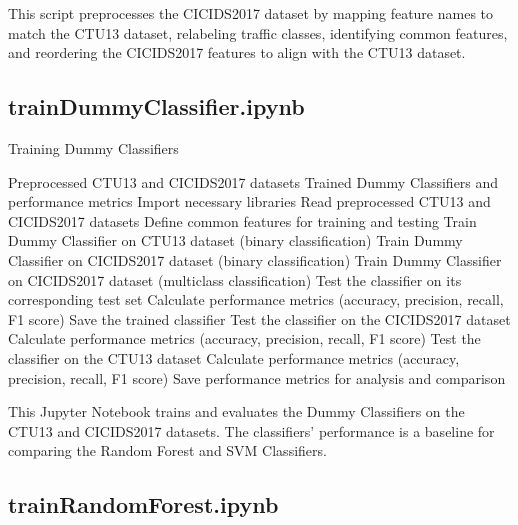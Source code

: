 This script preprocesses the CICIDS2017 dataset by mapping feature names to match the CTU13 dataset, relabeling traffic classes, identifying common features, and reordering the CICIDS2017 features to align with the CTU13 dataset.

\subsection{trainDummyClassifier.ipynb}\label{subsec:trainDummyClassifier.ipynb}

\begin{algorithm}[H]
    \caption{Training Dummy Classifiers}\label{alg:trainDummyClassifier}
    \begin{algorithmic}[1]
    \Require Preprocessed CTU13 and CICIDS2017 datasets
    \Ensure Trained Dummy Classifiers and performance metrics
    \State Import necessary libraries
    \State Read preprocessed CTU13 and CICIDS2017 datasets
    \State Define common features for training and testing
    \State Train Dummy Classifier on CTU13 dataset (binary classification)
    \State Train Dummy Classifier on CICIDS2017 dataset (binary classification)
    \State Train Dummy Classifier on CICIDS2017 dataset (multiclass classification)
    \EndIf
    \EndFor
    \State Test the classifier on its corresponding test set
    \State Calculate performance metrics (accuracy, precision, recall, F1 score)
    \State Save the trained classifier
    \EndFor
    \State Test the classifier on the CICIDS2017 dataset
    \State Calculate performance metrics (accuracy, precision, recall, F1 score)
    \EndFor
    \State Test the classifier on the CTU13 dataset
    \State Calculate performance metrics (accuracy, precision, recall, F1 score)
    \EndFor
    \State Save performance metrics for analysis and comparison
    \end{algorithmic}
\end{algorithm}

This Jupyter Notebook trains and evaluates the Dummy Classifiers on the CTU13 and CICIDS2017 datasets. The classifiers' performance is a baseline for comparing the Random Forest and SVM Classifiers.

\subsection{trainRandomForest.ipynb}\label{subsec:trainRandomForest.ipynb}

